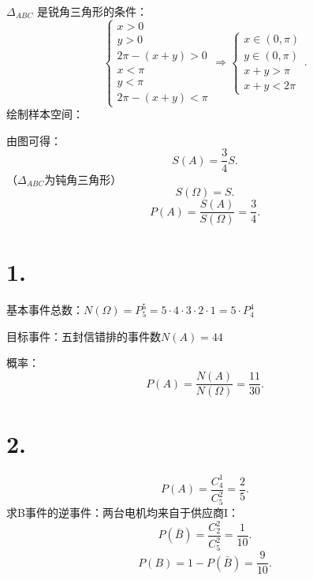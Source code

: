 $\Delta_{ABC}$ 是锐角三角形的条件：\[
    \begin{cases}
        x>0\\
        y>0\\
        2\pi-\left( x+y \right) >0\\
        x<\pi\\
        y<\pi\\
        2\pi-\left( x+y \right) <\pi
    \end{cases}
    \Rightarrow
    \begin{cases}
        x\in \left( 0,\pi \right) \\
        y\in \left( 0,\pi \right)\\
        x+y>\pi\\
        x+y<2\pi
    \end{cases}
.\] 
绘制样本空间：
\begin{center}
\end{center}
由图可得：\[
    S\left( A \right) =\frac{3}{4}S
.\] （$\Delta_{ABC}$为钝角三角形）
\[
    S\left( \Omega \right) =S
.\] 
\[
    P\left( A \right) =\frac{S\left( A \right) }{S\left( \Omega \right) }=\frac{3}{4}
.\] 

\section{1.}%
\label{sec:1.}
基本事件总数：$N\left( \Omega \right) =P_{5}^{5}=5\cdot 4\cdot 3\cdot 2\cdot 1=5\cdot P_{4}^{4}$

目标事件：五封信错排的事件数$N\left( A \right) =44$

概率：\[
    P\left( A \right) =\frac{N\left( A \right) }{N\left( \Omega \right) }=\frac{11}{30}
.\] 

\section{2.}%
\label{sec:2.}
\[
    P\left( A \right) =\frac{C_{4}^{1}}{C_{5}^{2}}=\frac{2}{5}
.\] 
求B事件的逆事件：两台电机均来自于供应商I：
\[
    P\left( \bar{B} \right) =\frac{C_{2}^{2}}{C_{5}^{2}}=\frac{1}{10}
.\] 
\[
    P\left( B \right) =1-P\left( \bar{B} \right) =\frac{9}{10}
.\] 

